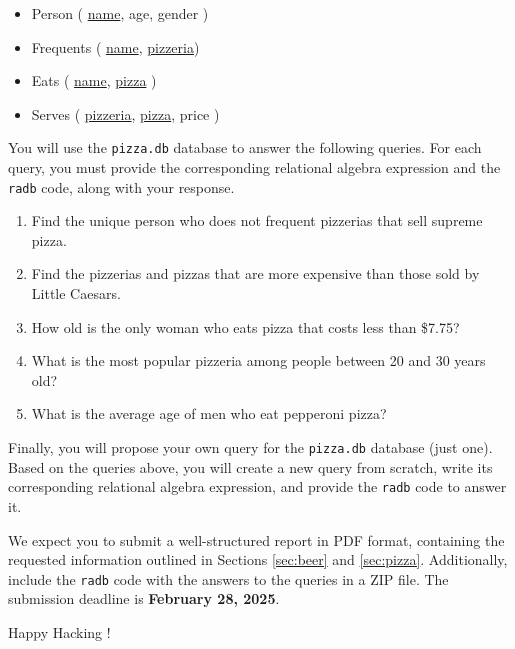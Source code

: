 \documentclass{article}
\begin{document}
\begin{itemize}
  \item Person ( \underline{name}, age, gender )
  \item Frequents ( \underline{name}, \underline{pizzeria})
  \item Eats ( \underline{name}, \underline{pizza} )
  \item Serves ( \underline{pizzeria}, \underline{pizza}, price )
\end{itemize}

You will use the \texttt{pizza.db} database to answer the following queries. For each query, you must provide the corresponding relational algebra expression and the \texttt{radb} code, along with your response.

\begin{enumerate}
  \item Find the unique person who does not frequent pizzerias that sell supreme pizza.

  \item Find the pizzerias and pizzas that are more expensive than those sold by Little Caesars.

  \item How old is the only woman who eats pizza that costs less than \$7.75?

  \item What is the most popular pizzeria among people between 20 and 30 years old?

  \item What is the average age of men who eat pepperoni pizza?
\end{enumerate}

Finally, you will propose your own query for the \texttt{pizza.db} database (just one). Based on the queries above, you will create a new query from scratch, write its corresponding relational algebra expression, and provide the \texttt{radb} code to answer it.

We expect you to submit a well-structured report in PDF format, containing the requested information outlined in Sections \ref{sec:beer} and \ref{sec:pizza}. Additionally, include the \texttt{radb} code with the answers to the queries in a ZIP file. The submission deadline is \textbf{February 28, 2025}.

\vspace{4mm}
Happy Hacking \smiley!
\end{document}
